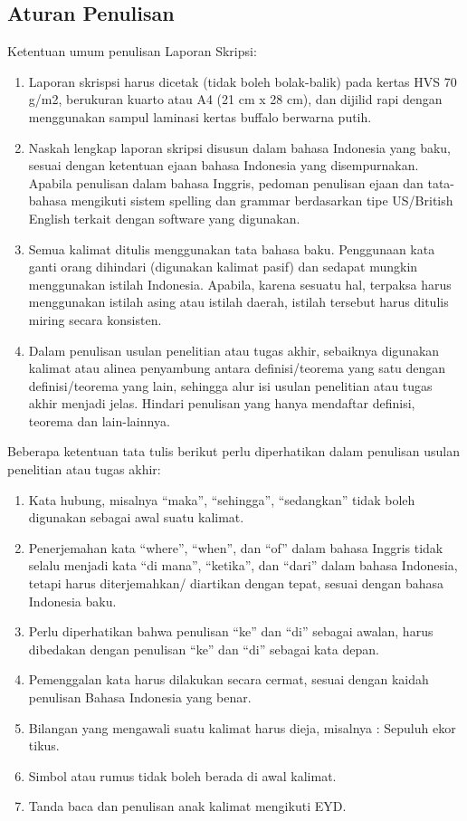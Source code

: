  \subsection{Aturan Penulisan}
   Ketentuan umum penulisan Laporan Skripsi:
   \begin{enumerate}[noitemsep,label=\alph*.]
   	\item   Laporan skrispsi harus dicetak (tidak boleh bolak-balik) pada kertas HVS 70 g/m2, berukuran kuarto atau A4 (21 cm x 28 cm), dan dijilid rapi dengan menggunakan sampul laminasi kertas buffalo berwarna putih.
   	\item Naskah lengkap laporan skripsi disusun dalam bahasa Indonesia yang baku, sesuai dengan ketentuan ejaan bahasa Indonesia yang disempurnakan. Apabila penulisan dalam bahasa Inggris, pedoman penulisan ejaan dan tata-bahasa mengikuti sistem spelling dan grammar berdasarkan tipe US/British English terkait dengan software yang digunakan.
   	\item Semua kalimat ditulis menggunakan tata bahasa baku. Penggunaan kata ganti orang dihindari (digunakan kalimat pasif) dan sedapat mungkin menggunakan istilah Indonesia. Apabila, karena sesuatu hal, terpaksa harus menggunakan istilah asing atau istilah daerah, istilah tersebut harus ditulis miring secara konsisten.
   	\item Dalam penulisan usulan penelitian atau tugas akhir, sebaiknya digunakan kalimat atau alinea penyambung antara definisi/teorema yang satu dengan definisi/teorema yang lain, sehingga alur isi usulan penelitian atau tugas akhir menjadi jelas. Hindari penulisan yang hanya mendaftar definisi, teorema dan lain-lainnya.
   \end{enumerate}
  
   Beberapa ketentuan tata tulis berikut perlu diperhatikan dalam penulisan usulan penelitian atau tugas akhir:
   \begin{enumerate}[noitemsep]
   	\item   Kata hubung, misalnya “maka”, “sehingga”, “sedangkan” tidak boleh digunakan sebagai awal suatu kalimat.
   	\item Penerjemahan kata “where”, “when”, dan “of” dalam bahasa Inggris tidak selalu menjadi kata “di mana”, “ketika”, dan “dari” dalam bahasa Indonesia, tetapi harus diterjemahkan/ diartikan dengan tepat, sesuai dengan bahasa Indonesia baku.
   	\item Perlu diperhatikan bahwa penulisan “ke” dan “di” sebagai awalan, harus dibedakan dengan penulisan “ke” dan “di” sebagai kata depan.
   	\item Pemenggalan kata harus dilakukan secara cermat, sesuai dengan kaidah penulisan Bahasa Indonesia yang benar.
   	\item Bilangan yang mengawali suatu kalimat harus dieja, misalnya : Sepuluh ekor tikus.
   	\item Simbol atau rumus tidak boleh berada di awal kalimat.
   	\item Tanda baca dan penulisan anak kalimat mengikuti EYD.
   \end{enumerate}
  

